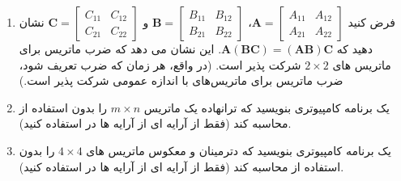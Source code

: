 {\begin{spacing}{1.5}
\begin{enumerate}[label=\textbf{\arabic*}.]
            \item {فرض کنید $\textbf{A}=\begin{bmatrix}
                                            A_{11} & A_{12} \\
                                            A_{21} & A_{22}
            \end{bmatrix}$، $\textbf{B}=\begin{bmatrix}
                                            B_{11} & B_{12} \\
                                            B_{21} & B_{22}
            \end{bmatrix}$ و $\textbf{C}=\begin{bmatrix}
                                             C_{11} & C_{12} \\
                                             C_{21} & C_{22}
            \end{bmatrix}$ نشان دهید که $\textbf{A}(\textbf{BC})=(\textbf{AB})\textbf{C}$.
            این نشان می دهد که ضرب ماتریس برای ماتریس های $2\times 2$ شرکت پذیر است.
                (در واقع، هر زمان که ضرب تعریف شود، ضرب ماتریس برای ماتریس‌های با اندازه عمومی شرکت پذیر است.)} \\\textbf{\vspace{6pt}}

            \item {یک برنامه کامپیوتری بنویسید که ترانهاده یک ماتریس $m\times n$ را بدون استفاده از  محاسبه کند
                (فقط از آرایه ای از آرایه ها در  استفاده کنید).} \\\textbf{\vspace{6pt}}

            \item {یک برنامه کامپیوتری بنویسید که دترمینان و معکوس ماتریس های $4\times 4$ را بدون استفاده از  محاسبه کند
                (فقط از آرایه ای از آرایه ها در  استفاده کنید).}
        \end{enumerate}
    \end{spacing}
}